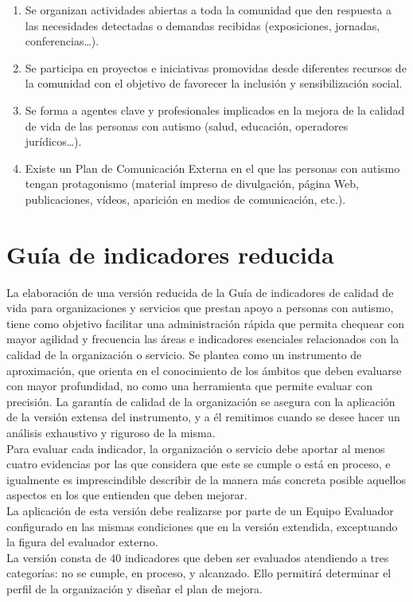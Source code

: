 \begin{itemize}
\begin{itemize}
		\begin{enumerate}
			\item Se organizan actividades abiertas a toda la comunidad que den respuesta a las necesidades detectadas o demandas recibidas (exposiciones, jornadas, conferencias…). 
			\item Se participa en proyectos e iniciativas promovidas desde diferentes recursos de la comunidad con el objetivo de favorecer la inclusión y sensibilización social. 
			\item Se forma a agentes clave y profesionales implicados en la mejora de la calidad de vida de las personas con autismo (salud, educación, operadores jurídicos…). 
			\item Existe un Plan de Comunicación Externa en el que las personas con autismo tengan protagonismo (material impreso de divulgación, página Web, publicaciones, vídeos, aparición en medios de comunicación, etc.). 
			
		\end{enumerate}
	\end{itemize}
\end{itemize}

\section{Guía de indicadores reducida}
La elaboración de una versión reducida de la Guía de indicadores de calidad de
vida para organizaciones y servicios que prestan apoyo a personas con autismo,
tiene como objetivo facilitar una administración rápida que permita chequear con
mayor agilidad y frecuencia las áreas e indicadores esenciales relacionados con
la calidad de la organización o servicio. Se plantea como un instrumento de
aproximación, que orienta en el conocimiento de los ámbitos que deben evaluarse
con mayor profundidad, no como una herramienta que permite evaluar con
precisión. La garantía de calidad de la organización se asegura con la
aplicación de la versión extensa del instrumento, y a él remitimos cuando se
desee hacer un análisis exhaustivo y riguroso de la misma. 
 \\
Para evaluar cada indicador, la organización o servicio debe aportar al menos
cuatro evidencias por las que considera que este se cumple o está en proceso, e
igualmente es imprescindible describir de la manera más concreta posible
aquellos aspectos en los que entienden que deben mejorar.  
 \\
La aplicación de esta versión debe realizarse por parte de un Equipo Evaluador configurado en las mismas condiciones que en la versión extendida, exceptuando la figura del evaluador externo.  
 \\
La versión consta de 40 indicadores que deben ser evaluados atendiendo a tres
categorías: no se cumple, en proceso, y alcanzado. Ello permitirá determinar el
perfil de la organización y diseñar el plan de mejora.  

